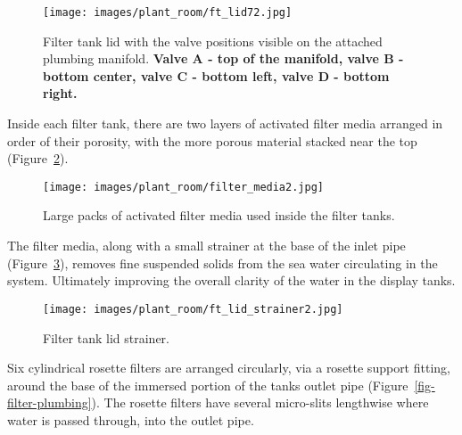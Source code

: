 \documentclass[
  letterpaper,
  DIV=11,
  numbers=noendperiod]{scrreprt}
\begin{document}
\begin{figure}[H]

{\centering \texttt{[image: images/plant\_room/ft\_lid72.jpg]}

}

\caption{\label{fig-lid}Filter tank lid with the valve positions visible
on the attached plumbing manifold. \textbf{Valve A - top of the
manifold, valve B - bottom center, valve C - bottom left, valve D -
bottom right.}}

\end{figure}

Inside each filter tank, there are two layers of activated filter media
arranged in order of their porosity, with the more porous material
stacked near the top (Figure~\ref{fig-charcoal}).

\begin{figure}[H]

{\centering \texttt{[image: images/plant\_room/filter\_media2.jpg]}

}

\caption{\label{fig-charcoal}Large packs of activated filter media used
inside the filter tanks.}

\end{figure}

The filter media, along with a small strainer at the base of the inlet
pipe (Figure~\ref{fig-lid-strainer}), removes fine suspended solids from
the sea water circulating in the system. Ultimately improving the
overall clarity of the water in the display tanks.

\begin{figure}[H]

{\centering \texttt{[image: images/plant\_room/ft\_lid\_strainer2.jpg]}

}

\caption{\label{fig-lid-strainer}Filter tank lid strainer.}

\end{figure}

Six cylindrical rosette filters are arranged circularly, via a rosette
support fitting, around the base of the immersed portion of the tanks
outlet pipe (Figure~\ref{fig-filter-plumbing}). The rosette filters have
several micro-slits lengthwise where water is passed through, into the
outlet pipe.
\end{document}
